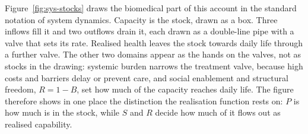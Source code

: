 Figure~\ref{fig:sys-stocks} draws the biomedical part of this account in the
standard notation of system dynamics. Capacity is the stock, drawn as a box.
Three inflows fill it and two outflows drain it, each drawn as a double-line
pipe with a valve that sets its rate. Realised health leaves the stock towards
daily life through a further valve. The other two domains appear as the hands
on the valves, not as stocks in the drawing: systemic burden narrows the
treatment valve, because high costs and barriers delay or prevent care, and
social enablement and structural freedom, $R=1-B$, set how much of the
capacity reaches daily life. The figure therefore shows in one place the
distinction the realisation function rests on: $P$ is how much is in the
stock, while $S$ and $R$ decide how much of it flows out as realised
capability.

